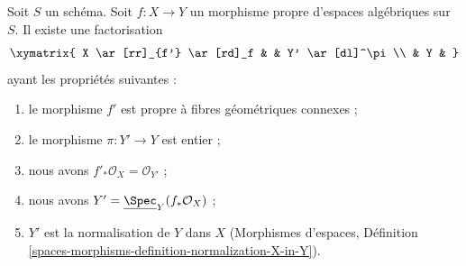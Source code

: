 \begin{theorem}
\label{theorem-stein-factorization-general}
Soit $S$ un schéma. Soit $f : X \to Y$ un morphisme propre d'espaces
algébriques sur $S$. Il existe une factorisation
$$
\xymatrix{
X \ar[rr]_{f'} \ar[rd]_f & & Y' \ar[dl]^\pi \\
& Y &
}
$$
ayant les propriétés suivantes :
\begin{enumerate}
\item le morphisme $f'$ est propre à fibres géométriques connexes ;
\item le morphisme $\pi : Y' \to Y$ est entier ;
\item nous avons $f'_*\mathcal{O}_X = \mathcal{O}_{Y'}$ ;
\item nous avons $Y' = \underline{\Spec}_Y(f_*\mathcal{O}_X)$ ;
\item $Y'$ est la normalisation de $Y$ dans $X$ (Morphismes d'espaces, Définition
\ref{spaces-morphisms-definition-normalization-X-in-Y}).
\end{enumerate}
\end{theorem}

